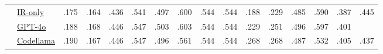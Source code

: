 \begin{table}[!t]
\begin{tabularx}{\textwidth}{llZZZZZZZZZZZZZZ}
                                                                & \hphantom{ }\underline{IR-only}            & .175                      & .164
                                                                & .436               & .541
                                                                & .497               & .600
                                                                & .544               & .544
                                                                & .188               & .229
                                                                & .485               & .590   & .387
& .445
                                                                                                                                                                                                                                                                                \\
        \midrule
                           & \hphantom{ }\underline{GPT-4o}             & .188                      & .168
        & .446               & .547
        & .503               & .603
        & .544               & .544
        & .229               & .251
        & .496               & .597   & .401
& 
                                                                                                                                                                                                                                                                                \\
        & \hphantom{ }\underline{Codellama}          & .190                      & .167
        & .446               & .547
        & .496               & .561
        & .544               & .544
        & .268               & .268
        & .487               & .532    & .405
& .437
                                                                                                                                                                                                                                                                               \\



\end{tabularx}
\end{table}
